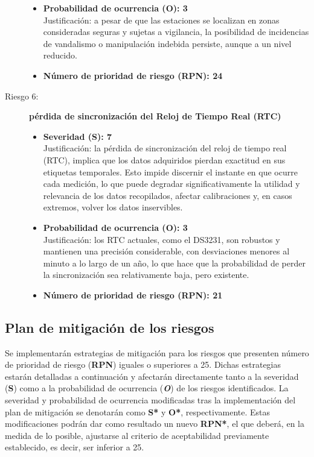 \begin{description}
\begin{itemize}
		\item \textbf{Probabilidad de ocurrencia (O): 3} \\
		Justificación: a pesar de que las estaciones se localizan en zonas consideradas seguras y sujetas a vigilancia, la posibilidad de incidencias de vandalismo o manipulación indebida persiste, aunque a un nivel reducido.
		
		\item \textbf{Número de prioridad de riesgo (RPN): 24} \\
	\end{itemize}
	
	
	\item[Riesgo 6:] \textbf{pérdida de sincronización del Reloj de Tiempo Real (RTC)}
	\begin{itemize}
		\item \textbf{Severidad (S): 7} \\
		Justificación: la pérdida de sincronización del reloj de tiempo real (RTC), implica que los datos adquiridos pierdan exactitud en sus etiquetas temporales. Esto impide discernir el instante en que ocurre cada medición, lo que puede degradar significativamente la utilidad y relevancia de los datos recopilados, afectar calibraciones y, en casos extremos, volver los datos inservibles.
		
		\item \textbf{Probabilidad de ocurrencia (O): 3} \\
		Justificación: los RTC actuales, como el DS3231, son robustos y mantienen una precisión considerable, con desviaciones menores al minuto a lo largo de un año, lo que hace que la probabilidad de perder la sincronización sea relativamente baja, pero existente.
		
		\item \textbf{Número de prioridad de riesgo (RPN): 21} \\
	\end{itemize}
	
	
	
	
\end{description}


\subsection{Plan de mitigación de los riesgos}

Se implementarán estrategias de mitigación para los riesgos que presenten número de prioridad de riesgo (\textbf{RPN}) iguales o superiores a 25. Dichas estrategias estarán detalladas a continuación y afectarán directamente tanto a la severidad (\textbf{S}) como a la probabilidad de ocurrencia (\textbf{\textit{O}}) de los riesgos identificados. La severidad y probabilidad de ocurrencia modificadas tras la implementación del plan de mitigación se denotarán como \textbf{S*} y \textbf{O*}, respectivamente. Estas modificaciones podrán dar como resultado un nuevo \textbf{RPN*}, el que deberá, en la medida de lo posible, ajustarse al criterio de aceptabilidad previamente establecido, es decir, ser inferior a 25.

